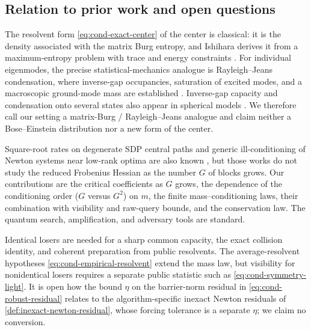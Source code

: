\subsection{Relation to prior work and open questions}
\label{sec:condensation-discussion}

The resolvent form \eqref{eq:cond-exact-center} of the center is classical:
it is the density associated with the matrix Burg entropy, and Ishihara
derives it from a maximum-entropy problem with trace and energy constraints
\cite{ishihara2019-density-operators-generalized-entropies}.  For individual
eigenmodes, the precise statistical-mechanics analogue is Rayleigh--Jeans
condensation, where inverse-gap occupancies, saturation of excited modes,
and a macroscopic ground-mode mass are established
\cite{baudin2020-rayleigh-jeans-condensation,zanaglia2024-bridging-rayleigh-jeans}.
Inverse-gap capacity and condensation onto several states also appear in
spherical models
\cite{lukkarinen2018-multi-state-condensation,crisanti2019-condensation-ordering}.
We therefore call our setting a matrix-Burg / Rayleigh--Jeans analogue and
claim neither a Bose--Einstein distribution nor a new form of the center.

Square-root rates on degenerate SDP central paths and generic ill-conditioning
of Newton systems near low-rank optima are also known
\cite{cruzneto2005-asymptotic-central-path,alizadeh1998-primal-dual-sdp,zhang2017-modified-interior-point-method-for},
but those works do not study the reduced Frobenius Hessian as the number $G$
of blocks grows.  Our contributions are the critical coefficients as $G$
grows, the dependence of the conditioning order ($G$ versus $G^2$) on $m$,
the finite mass--conditioning laws, their combination with visibility and
raw-query bounds, and the conservation law.  The quantum search,
amplification, and adversary tools are standard.

Identical losers are needed for a sharp common capacity, the exact collision
identity, and coherent preparation from public resolvents.  The
average-resolvent hypotheses \eqref{eq:cond-empirical-resolvent} extend the
mass law, but visibility for nonidentical losers requires a separate public
statistic such as \eqref{eq:cond-symmetry-light}.  It is open how the
bound $\eta$ on the barrier-norm residual in \eqref{eq:cond-robust-residual}
relates to the algorithm-specific inexact Newton residuals of
\cref{def:inexact-newton-residual}, whose forcing tolerance is a separate
$\eta$; we claim no conversion.
